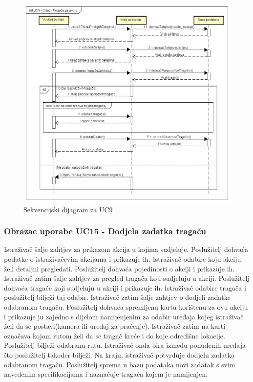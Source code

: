 \begin{packed_item}
\begin{packed_item}
				\eject
				
				\begin{figure}[H]
					\includegraphics[scale=0.6]{dijagrami/UC9-Odabir tragača za akciju} 
					\centering
					\caption{Sekvencijski dijagram za UC9}
					\label{fig:promjene}
				\end{figure}
				
				\eject
				
				\subsubsection{Obrazac uporabe UC15 - Dodjela zadatka tragaču}
				Istraživač šalje zahtjev za prikazom akcija u kojima sudjeluje. Poslužitelj dohvaća podatke o istraživačevim akcijama i prikazuje ih. Istraživač odabire koju akciju želi detaljni pregledati. Poslužitelj dohvaća pojedinosti o akciji i prikazuje ih. Istraživač zatim šalje zahtjev za pregled tragača koji sudjeluju u akciji. Poslužitelj dohvaća tragače koji sudjeluju u akciji i prikazuje ih. Istraživač odabire tragača i poslužitelj bilježi taj odabir. Istraživač zatim šalje zahtjev o dodjeli zadatke odabranom tragaču. Poslužitelj dohvaća spremljenu kartu korištenu za ovu akciju i prikazuje ju zajedno s dijelom namijenjenim za odabir uređaja kojeg istraživač želi da se postavi(kamera ili uređaj za praćenje). Istraživač zatim na karti označava kojom rutom želi da se tragač kreće i do koje odredišne lokacije. Poslužitelj bilježi odabranu rutu. Istraživač onda bira između ponuđenih uređaja što poslužitelj također bilježi. Na kraju, istraživač potvrđuje dodjelu zadatka odabranom tragaču. Poslužitelj sprema u bazu podataka novi zadatak s svim navedenim specifikacijama i naznačuje tragača kojem je namijenjen. 
				

\end{packed_item}
\end{packed_item}
